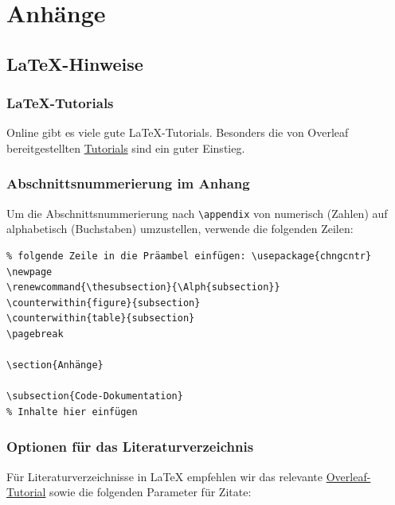 \newpage

\renewcommand{\thesubsection}{\Alph{subsection}}
\pagebreak
\appendix
\section{Anhänge}

\subsection{\LaTeX{}-Hinweise}
\label{sec:latex}

\subsubsection{\LaTeX{}-Tutorials}
Online gibt es viele gute \LaTeX{}-Tutorials. Besonders die von Overleaf bereitgestellten \href{https://www.google.com/search?client=safari&rls=en&q=overleaf+tutorial&ie=UTF-8&oe=UTF-8}{Tutorials} sind ein guter Einstieg.

\subsubsection{Abschnittsnummerierung im Anhang}
Um die Abschnittsnummerierung nach \lstinline|\appendix| von numerisch (Zahlen) auf alphabetisch (Buchstaben) umzustellen, verwende die folgenden Zeilen:

\begin{lstlisting}
% folgende Zeile in die Präambel einfügen: \usepackage{chngcntr}
\newpage
\renewcommand{\thesubsection}{\Alph{subsection}}
\counterwithin{figure}{subsection}
\counterwithin{table}{subsection}
\pagebreak  

\section{Anhänge}

\subsection{Code-Dokumentation}
% Inhalte hier einfügen
\end{lstlisting}



\subsubsection{Optionen für das Literaturverzeichnis}
Für Literaturverzeichnisse in \LaTeX{} empfehlen wir das relevante \href{https://de.overleaf.com/learn/latex/Bibliography_management_with_biblatex}{Overleaf-Tutorial} sowie die folgenden Parameter für Zitate:

